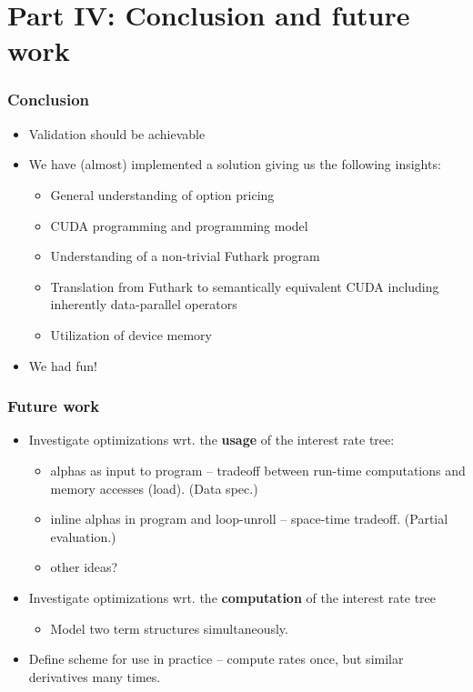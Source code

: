 \section{Part IV: Conclusion and future work}

\begin{frame}
  \frametitle{Conclusion}
%
\begin{itemize}
  \item Validation should be achievable
  \item We have (almost) implemented a solution giving us the following insights:
    \begin{itemize}
      \item General understanding of option pricing
      \item CUDA programming and programming model
      \item Understanding of a non-trivial Futhark program
      \item Translation from Futhark to semantically equivalent CUDA including inherently data-parallel operators
      \item Utilization of device memory
    \end{itemize}
  \item We had fun!
\end{itemize}
%
\end{frame}


\begin{frame}
  \frametitle{Future work}
  \begin{itemize}
  \item Investigate optimizations wrt. the \textbf{usage} of
    the interest rate tree:
    \begin{itemize}
      \item alphas as input to program -- tradeoff between
        run-time computations and memory accesses (load). (Data spec.)
      \item inline alphas in program and loop-unroll --
        space-time tradeoff. (Partial evaluation.)
      \item other ideas?
    \end{itemize}
  \item Investigate optimizations wrt. the
    \textbf{computation} of the interest rate tree
    \begin{itemize}
    \item Model two term structures simultaneously.
    \end{itemize}
  \item Define scheme for use in practice -- compute rates
    once, but similar derivatives many times.
  \end{itemize}
\end{frame}
